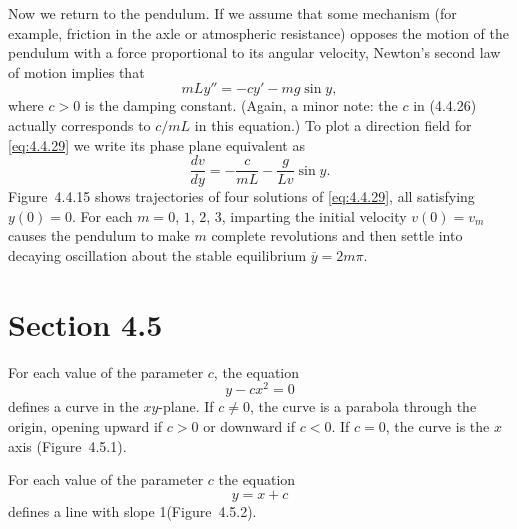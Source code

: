\setcounter{example}{3}
\setcounter{equation}{28}
\begin{example}
  \label{example:4.4.5} \rm Now we return to the pendulum. If we assume that some mechanism (for
  example, friction in the axle or atmospheric resistance) opposes the motion of the pendulum with a
  force proportional to its angular velocity, Newton's second law of motion implies that
  \begin{equation}
    \label{eq:4.4.29}mLy''=-cy'-mg\sin y,
  \end{equation}
  where $c>0$ is the damping constant. (Again, a minor note: the $c$ in \textup{(4.4.26)} actually
  corresponds to $c/mL$ in this equation.) To plot a direction field for \eqref{eq:4.4.29} we write
  its phase plane equivalent as
  \[
    \frac{dv}{dy}=-\frac{c}{mL}-\frac{g}{Lv}\sin y.
  \]
  Figure~4.4.15 shows trajectories of four solutions of \eqref{eq:4.4.29}, all
  satisfying $y(0)=0$. For each $m=0$, $1$, $2$, $3$, imparting the initial velocity $v(0)=v_{m}$
  causes the pendulum to make $m$ complete revolutions and then settle into decaying oscillation
  about the stable equilibrium $\overline{y}=2m\pi$.
\end{example}

\section*{Section 4.5}
\setcounter{chapter}{4}
\setcounter{section}{5}

\setcounter{example}{0}
\setcounter{equation}{0}
\begin{example}
  \label{example:4.5.1} \rm For each value of the parameter $c$, the equation
  \begin{equation}
    \label{eq:4.5.1}y-cx^{2}=0
  \end{equation}
  defines a curve in the $xy$-plane. If $c\ne0$, the curve is a parabola through the origin, opening
  upward if $c>0$ or downward if $c<0$. If $c=0$, the curve is the $x$ axis
  (Figure~4.5.1).
\end{example}

\setcounter{example}{1}
\setcounter{equation}{1}
\begin{example}
  \label{example:4.5.2} \rm For each value of the parameter $c$ the equation
  \begin{equation}
    \label{eq:4.5.2}y=x+c
  \end{equation}
  defines a line with slope 1(Figure~4.5.2).
\end{example}

